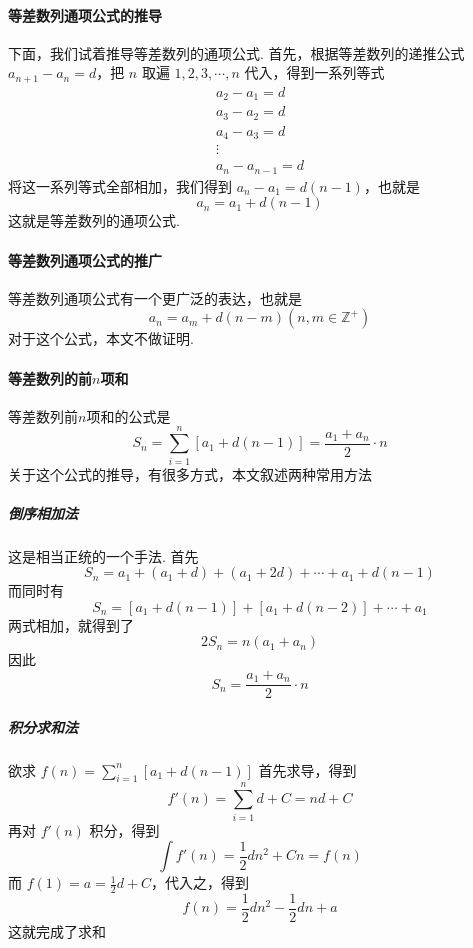 \documentclass[UTF8]{ctexart}
\def\inlinedisplay#1{$\displaystyle #1$}
\begin{document}
	\paragraph{等差数列通项公式的推导}
	下面，我们试着推导等差数列的通项公式.
	\newline
	首先，根据等差数列的递推公式 \inlinedisplay{a_{n+1}-a_n = d}，把 $n$ 取遍 \inlinedisplay{1,2,3,\cdots,n} 代入，得到一系列等式
	\begin{gather*}
	a_2-a_1=d
	\\
	a_3-a_2=d
	\\
	a_4-a_3=d
	\\
	\vdots
	\\
	a_n-a_{n-1}=d
	\end{gather*}
	将这一系列等式全部相加，我们得到 $a_n-a_1=d(n-1)$，也就是
	\[a_n = a_1 + d(n-1)\]
	这就是等差数列的通项公式.
	\paragraph{等差数列通项公式的推广}
	等差数列通项公式有一个更广泛的表达，也就是
	\[a_n = a_m + d(n-m) (n,m \in \mathbb{Z} ^ +)\]
	对于这个公式，本文不做证明.
	\paragraph{等差数列的前$n$项和}
	等差数列前$n$项和的公式是
	\[S_n = \sum_{i=1}^{n} [a_1 + d(n-1)] = \frac{a_1+a_n}{2} \cdot n\]
	关于这个公式的推导，有很多方式，本文叙述两种常用方法
	\subparagraph{倒序相加法}
	这是相当正统的一个手法. 首先
	\[S_n = a_1 + (a_1 + d) + (a_1 + 2d) + \cdots + a_1 + d(n-1)\]
	而同时有
	\[S_n = [a_1 + d(n-1)] + [a_1 + d(n-2)] + \cdots + a_1\]
	两式相加，就得到了
	\[2S_n = n(a_1 + a_n)\]
	因此
	\[S_n = \frac{a_1+a_n}{2} \cdot n \]
	\subparagraph{积分求和法}
	欲求 \inlinedisplay{f(n) = \sum_{i=1}^{n} [a_1 + d(n-1)]}
	首先求导，得到
	\[f'(n) = \sum_{i=1}^{n} d + C = nd + C\]
	再对 $f'(n)$ 积分，得到
	\[\int{f'(n)} = \frac{1}{2}dn^2 + Cn = f(n) \]
	而 \inlinedisplay{f(1) = a = \frac{1}{2}d + C}，代入之，得到
	\[f(n) = \frac{1}{2}dn^2 - \frac{1}{2}dn + a \]
	这就完成了求和
	
\end{document}
